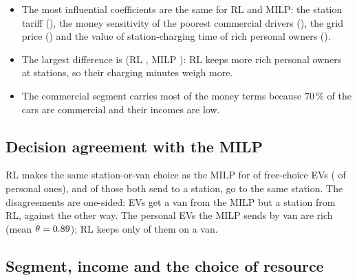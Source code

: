 \begin{itemize}
  \item The most influential coefficients are the same for RL and MILP: the station tariff \ElTopOne{} (\ElTopOneV\pct), the money sensitivity of the poorest commercial drivers \ElTopTwo{} (\ElTopTwoV\pct), the grid price \ElTopThree{} (\ElTopThreeV\pct) and the value of station-charging time of rich personal owners \ElTopFour{} (\ElTopFourV\pct).
  \item The largest difference is \ElDiffCoef{} (RL \ElDiffRL\pct, MILP \ElDiffM\pct): RL keeps more rich personal owners at stations, so their charging minutes weigh more.
  \item The commercial segment carries most of the money terms because 70\,\% of the cars are commercial and their incomes are low.
\end{itemize}


\subsection{Decision agreement with the MILP}
\label{sec:agreement}



RL makes the same station-or-van choice as the MILP for \AgreeType\pct{} of free-choice EVs (\AgreePers\pct{} of personal ones), and of those both send to a station, \AgreeStation\pct{} go to the same station. The disagreements are one-sided: \MilpVanRlFcs{} EVs get a van from the MILP but a station from RL, against \RlVanMilpFcs{} the other way. The personal EVs the MILP sends by van are rich (mean $\theta=0.89$); RL keeps only \MilpVanPersKeptRl\pct{} of them on a van.


\subsection{Segment, income and the choice of resource}
\label{sec:income}

